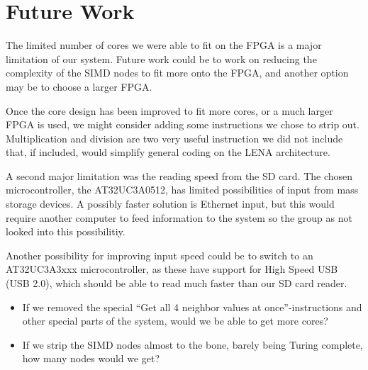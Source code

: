 \section{Future Work}
The limited number of cores we were able to fit on the FPGA is a major limitation
of our system. Future work could be to work on reducing the complexity of the
SIMD nodes to fit more onto the FPGA, and another option may be to choose a larger
FPGA.

Once the core design has been improved to fit more cores, or a much larger FPGA is
used, we might consider adding some instructions we chose to strip out. Multiplication
and division are two very useful instruction we did not include that, if included, would simplify
general coding on the LENA architecture.

A second major limitation was the reading speed from the SD card.
The chosen microcontroller, the AT32UC3A0512, has limited possibilities of input
from mass storage devices. A possibly faster solution is Ethernet input, but this
would require another computer to feed information to the system so the group
as not looked into this possibilitiy.

Another possibility for improving input speed could be to switch to an AT32UC3A3xxx
microcontroller, as these have support for High Speed USB (USB 2.0), which should be
able to read much faster than our SD card reader.

\begin{itemize}
\item If we removed the special ``Get all 4 neighbor values at
  once''-instructions and other special parts of the system, would we be able to
  get more cores?
\item If we strip the \ac{SIMD} nodes almost to the bone, barely being Turing
  complete, how many nodes would we get?
\end{itemize}
